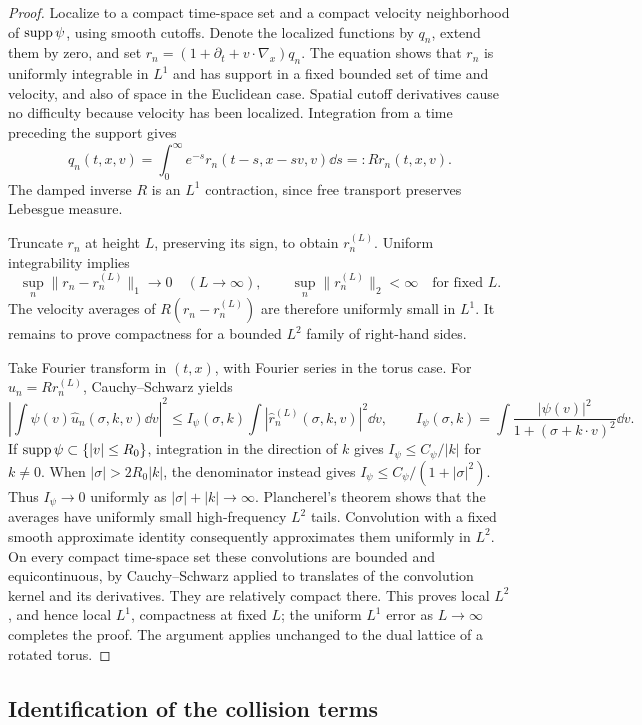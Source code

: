 \begin{proof}
Localize to a compact time-space set and a compact velocity
neighborhood of $\operatorname{supp}\psi$, using smooth cutoffs. Denote the localized
functions by $q_n$, extend them by zero, and set
$r_n=(1+\partial_t+v\cdot\nabla_x)q_n$.
The equation shows that $r_n$ is uniformly integrable in $L^1$ and has
support in a fixed bounded set of time and velocity, and also of space
in the Euclidean case. Spatial cutoff derivatives cause no difficulty
because velocity has been localized. Integration from a time preceding
the support gives
\[
 q_n(t,x,v)=\int_0^\infty e^{-s}r_n(t-s,x-sv,v)\dd s=:Rr_n(t,x,v).
\]
The damped inverse $R$ is an $L^1$ contraction, since free transport
preserves Lebesgue measure.

Truncate $r_n$ at height $L$, preserving its sign, to obtain
$r_n^{(L)}$. Uniform integrability implies
\[
 \sup_n\|r_n-r_n^{(L)}\|_1\longrightarrow0
 \quad(L\to\infty),\qquad
 \sup_n\|r_n^{(L)}\|_2<\infty
 \quad\text{for fixed }L.
\]
The velocity averages of $R(r_n-r_n^{(L)})$ are therefore uniformly
small in $L^1$. It remains to prove compactness for a bounded $L^2$
family of right-hand sides.

Take Fourier transform in $(t,x)$, with Fourier series in the torus
case. For $u_n=Rr_n^{(L)}$, Cauchy--Schwarz yields
\[
 \left|\int\psi(v)\widehat u_n(\sigma,k,v)\dd v\right|^2
 \le I_\psi(\sigma,k)
       \int|\widehat r_n^{(L)}(\sigma,k,v)|^2\dd v,
 \qquad
 I_\psi(\sigma,k)=\int
 \frac{|\psi(v)|^2}{1+(\sigma+k\cdot v)^2}\dd v.
\]
If $\operatorname{supp}\psi\subset\{|v|\le R_0\}$, integration in the direction
of $k$ gives $I_\psi\le C_\psi/|k|$ for $k\ne0$.
When $|\sigma|>2R_0|k|$, the denominator instead gives
$I_\psi\le C_\psi/(1+|\sigma|^2)$.
Thus $I_\psi\to0$ uniformly as $|\sigma|+|k|\to\infty$.
Plancherel's theorem shows that the averages have uniformly small
high-frequency $L^2$ tails. Convolution with a fixed smooth approximate
identity consequently approximates them uniformly in $L^2$.
On every compact time-space set these convolutions are bounded and
equicontinuous, by Cauchy--Schwarz applied to translates of the
convolution kernel and its derivatives. They are relatively compact
there. This proves local $L^2$, and hence local $L^1$, compactness at
fixed $L$; the uniform $L^1$ error as $L\to\infty$ completes the proof.
The argument applies unchanged to the dual lattice of a rotated torus.
\end{proof}

\subsection{Identification of the collision terms}

